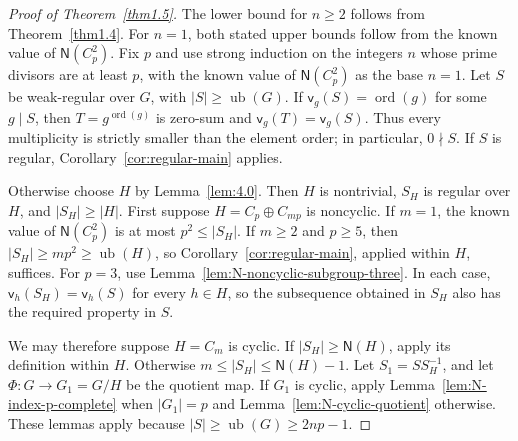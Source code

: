 \documentclass[10pt,a4paper]{amsart}
\theoremstyle{definition}
\theoremstyle{remark}
\numberwithin{equation}{section}
\DeclareMathOperator{\ord}{ord}
\begin{document}
\begin{proof}[Proof of Theorem~\ref{thm1.5}]
The lower bound for $n\ge2$ follows from Theorem~\ref{thm1.4}.
For $n=1$, both stated upper bounds follow from the known value of
$\mathsf N(C_p^2)$.
Fix $p$ and use strong induction on the integers $n$ whose prime divisors are at least $p$,
with the known value of $\mathsf N(C_p^2)$ as the base $n=1$.
Let $S$ be weak-regular over $G$, with $|S|\ge \operatorname{ub}(G)$.
If $\mathsf v_g(S)=\ord(g)$ for some $g\mid S$, then
$T=g^{\ord(g)}$ is zero-sum and $\mathsf v_g(T)=\mathsf v_g(S)$.
Thus every multiplicity is strictly smaller than the element order;
in particular, $0\nmid S$.
If $S$ is regular, Corollary~\ref{cor:regular-main} applies.

Otherwise choose $H$ by Lemma~\ref{lem:4.0}.
Then $H$ is nontrivial, $S_H$ is regular over $H$, and $|S_H|\ge|H|$.
First suppose $H=C_p\oplus C_{mp}$ is noncyclic.
If $m=1$, the known value of $\mathsf N(C_p^2)$ is at most $p^2\le|S_H|$.
If $m\ge2$ and $p\ge5$, then $|S_H|\ge mp^2\ge \operatorname{ub}(H)$,
so Corollary~\ref{cor:regular-main}, applied within $H$, suffices.
For $p=3$, use Lemma~\ref{lem:N-noncyclic-subgroup-three}.
In each case, $\mathsf v_h(S_H)=\mathsf v_h(S)$ for every $h\in H$,
so the subsequence obtained in $S_H$ also has the required property in $S$.

We may therefore suppose $H=C_m$ is cyclic.
If $|S_H|\ge\mathsf N(H)$, apply its definition within $H$.
Otherwise $m\le|S_H|\le\mathsf N(H)-1$.
Let $S_1=SS_H^{-1}$, and let $\Phi:G\to G_1=G/H$ be the quotient map.
If $G_1$ is cyclic, apply Lemma~\ref{lem:N-index-p-complete} when $|G_1|=p$
and Lemma~\ref{lem:N-cyclic-quotient} otherwise.
These lemmas apply because $|S|\ge \operatorname{ub}(G)\ge2np-1$.


\end{proof}
\end{document}
